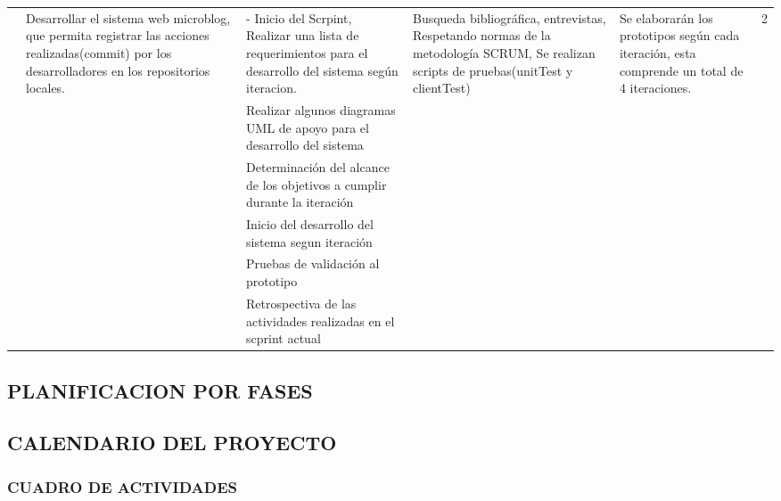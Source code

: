 \begin{center}
\begin{longtable}{|p{2cm}|p{2cm}|p{3cm}|p{2cm}|p{2cm}|p{1.2cm}|}
&\multirow{6}{2cm}{Desarrollar el sistema web microblog, que permita registrar las acciones realizadas(commit) por los desarrolladores en los repositorios locales.}&{- Inicio del Scrpint, Realizar una lista de requerimientos para el desarrollo del sistema según iteracion.}&\multirow{6}{2cm}{Busqueda bibliográfica, entrevistas, Respetando normas de la metodología SCRUM, Se realizan scripts de pruebas(unitTest y clientTest)}&\multirow{6}{2cm}{Se elaborarán los prototipos según cada iteración, esta comprende un total de 4 iteraciones.}&\multirow{2}{2cm}{2}\\\cline{3-3}

& &{Realizar algunos diagramas UML de apoyo para el desarrollo del sistema}&&&\\\cline{3-3}
& &{Determinación del alcance de los objetivos a cumplir durante la iteración}&&&\\\cline{3-3}
& &{Inicio del desarrollo del sistema segun iteración}&&&\\\cline{3-3}
& &{Pruebas de validación al prototipo}&&&\\\cline{3-3}
& &{Retrospectiva de las actividades realizadas en el scprint actual}&&&\\
\hline
\end{longtable}
\end{center}
\subsection{PLANIFICACION POR FASES}
\subsection{CALENDARIO DEL PROYECTO}
\subsubsection{CUADRO DE ACTIVIDADES}

%

